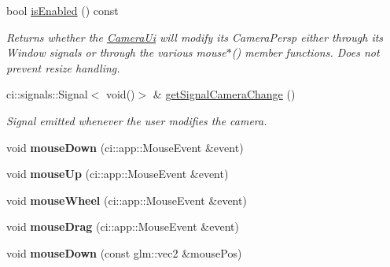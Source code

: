 \begin{DoxyCompactItemize}
\mbox{\label{classpepr3d_1_1_camera_ui_aac526bacbbfa39a6ae2be1527ec136fd}} 
bool \mbox{\hyperlink{classpepr3d_1_1_camera_ui_aac526bacbbfa39a6ae2be1527ec136fd}{is\+Enabled}} () const
\begin{DoxyCompactList}\small\item\em Returns whether the \mbox{\hyperlink{classpepr3d_1_1_camera_ui}{Camera\+Ui}} will modify its Camera\+Persp either through its Window signals or through the various mouse$\ast$() member functions. Does not prevent resize handling. \end{DoxyCompactList}\item 
\mbox{\label{classpepr3d_1_1_camera_ui_a54beecb97cfea39ce1419ca5e1591bf0}} 
ci\+::signals\+::\+Signal$<$ void()$>$ \& \mbox{\hyperlink{classpepr3d_1_1_camera_ui_a54beecb97cfea39ce1419ca5e1591bf0}{get\+Signal\+Camera\+Change}} ()
\begin{DoxyCompactList}\small\item\em Signal emitted whenever the user modifies the camera. \end{DoxyCompactList}\item 
\mbox{\label{classpepr3d_1_1_camera_ui_a62c243253900061a4af84f232523da73}} 
void {\bfseries mouse\+Down} (ci\+::app\+::\+Mouse\+Event \&event)
\item 
\mbox{\label{classpepr3d_1_1_camera_ui_ae45e7e28df6b627e1b2fa21523159208}} 
void {\bfseries mouse\+Up} (ci\+::app\+::\+Mouse\+Event \&event)
\item 
\mbox{\label{classpepr3d_1_1_camera_ui_a784f2397543a8aa466d9a5e00ebc3b8c}} 
void {\bfseries mouse\+Wheel} (ci\+::app\+::\+Mouse\+Event \&event)
\item 
\mbox{\label{classpepr3d_1_1_camera_ui_a4b2794c1584c5dc8bfe0f5bd93575018}} 
void {\bfseries mouse\+Drag} (ci\+::app\+::\+Mouse\+Event \&event)
\item 
\mbox{\label{classpepr3d_1_1_camera_ui_a97d323509224d0b9b16b0d837481271f}} 
void {\bfseries mouse\+Down} (const glm\+::vec2 \&mouse\+Pos)
\item 

\end{DoxyCompactItemize}
